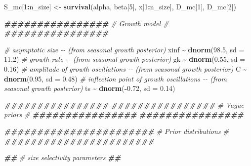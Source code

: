 \documentclass[
]{article}
\newenvironment{Shaded}{\begin{snugshade}}{\end{snugshade}}
\newcommand{\AttributeTok}[1]{\textcolor[rgb]{0.13,0.29,0.53}{#1}}
\newcommand{\CommentTok}[1]{\textcolor[rgb]{0.56,0.35,0.01}{\textit{#1}}}
\newcommand{\DecValTok}[1]{\textcolor[rgb]{0.00,0.00,0.81}{#1}}
\newcommand{\DocumentationTok}[1]{\textcolor[rgb]{0.56,0.35,0.01}{\textbf{\textit{#1}}}}
\newcommand{\FloatTok}[1]{\textcolor[rgb]{0.00,0.00,0.81}{#1}}
\newcommand{\FunctionTok}[1]{\textcolor[rgb]{0.13,0.29,0.53}{\textbf{#1}}}
\newcommand{\NormalTok}[1]{#1}
\newcommand{\OtherTok}[1]{\textcolor[rgb]{0.56,0.35,0.01}{#1}}
\newcommand{\SpecialCharTok}[1]{\textcolor[rgb]{0.81,0.36,0.00}{\textbf{#1}}}
\begin{document}
\begin{Shaded}
\begin{Highlighting}[]
\NormalTok{  S\_mc[}\DecValTok{1}\SpecialCharTok{:}\NormalTok{n\_size] }\OtherTok{\textless{}{-}} \FunctionTok{survival}\NormalTok{(alpha, beta[}\DecValTok{5}\NormalTok{], x[}\DecValTok{1}\SpecialCharTok{:}\NormalTok{n\_size], D\_mc[}\DecValTok{1}\NormalTok{], D\_mc[}\DecValTok{2}\NormalTok{])}
  
  \DocumentationTok{\#\#\#\#\#\#\#\#\#\#\#\#\#\#\#\#}
  \CommentTok{\# Growth model \#}
  \DocumentationTok{\#\#\#\#\#\#\#\#\#\#\#\#\#\#\#\#}
  
  \CommentTok{\# asymptotic size {-}{-} (from seasonal growth posterior)}
\NormalTok{  xinf }\SpecialCharTok{\textasciitilde{}} \FunctionTok{dnorm}\NormalTok{(}\FloatTok{98.5}\NormalTok{, }\AttributeTok{sd =} \FloatTok{11.2}\NormalTok{)}
  \CommentTok{\# growth rate {-}{-} (from seasonal growth posterior)}
\NormalTok{  gk }\SpecialCharTok{\textasciitilde{}} \FunctionTok{dnorm}\NormalTok{(}\FloatTok{0.55}\NormalTok{, }\AttributeTok{sd =} \FloatTok{0.16}\NormalTok{)}
  \CommentTok{\# amplitude of growth oscillations {-}{-} (from seasonal growth posterior)}
\NormalTok{  C }\SpecialCharTok{\textasciitilde{}} \FunctionTok{dnorm}\NormalTok{(}\FloatTok{0.95}\NormalTok{, }\AttributeTok{sd =} \FloatTok{0.48}\NormalTok{)}
  \CommentTok{\# inflection point of growth oscillations {-}{-} (from seasonal growth posterior)}
\NormalTok{  ts }\SpecialCharTok{\textasciitilde{}} \FunctionTok{dnorm}\NormalTok{(}\SpecialCharTok{{-}}\FloatTok{0.72}\NormalTok{, }\AttributeTok{sd =} \FloatTok{0.14}\NormalTok{)}
  
  
  \DocumentationTok{\#\#\#\#\#\#\#\#\#\#\#\#\#\#\#\#}
  \DocumentationTok{\#\#\#\#\#\#\#\#\#\#\#\#\#\#\#\#}
  \CommentTok{\# Vague priors \#}
  \DocumentationTok{\#\#\#\#\#\#\#\#\#\#\#\#\#\#\#\#}
  \DocumentationTok{\#\#\#\#\#\#\#\#\#\#\#\#\#\#\#\#}
  
  \DocumentationTok{\#\#\#\#\#\#\#\#\#\#\#\#\#\#\#\#\#\#\#\#\#\#\#}
  \CommentTok{\# Prior distributions \#}
  \DocumentationTok{\#\#\#\#\#\#\#\#\#\#\#\#\#\#\#\#\#\#\#\#\#\#\#}
  
  \DocumentationTok{\#\#}
  \CommentTok{\# size selectivity parameters}
  \DocumentationTok{\#\#}
  

\end{Highlighting}
\end{Shaded}
\end{document}
